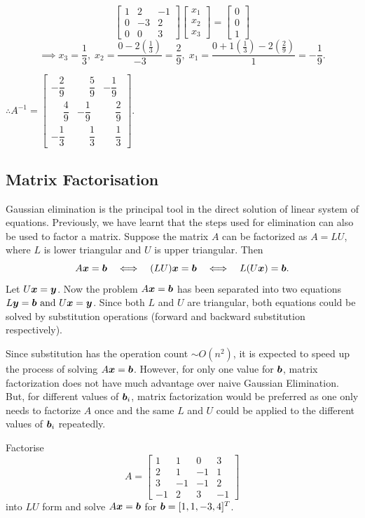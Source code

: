 \begin{solution}[5.0cm]
\medskip

\[
\begin{bmatrix}
1 & 2 & -1\\
0 & -3 & 2\\
0 & 0 & 3
\end{bmatrix}
\begin{bmatrix}
x_1 \\ x_2 \\ x_3
\end{bmatrix}
=
\begin{bmatrix}
0 \\ 0 \\ 1
\end{bmatrix}
\]
\[
\implies
x_3 = \frac13, \; x_2 = \frac{0-2(\frac13)}{-3} = \frac29, \; x_1 = \frac{0+1(\frac13)-2(\frac29)}{1}=-\frac19.
\]

\medskip
\(
 \therefore A^{-1}=\begin{bmatrix}
 -\dfrac29&\phantom{-}\dfrac59&-\dfrac19\\[3mm]
 \phantom{-}\dfrac49&-\dfrac19&\phantom{-}\dfrac29\\[3mm]
 -\dfrac13&\phantom{-}\dfrac13&\phantom{-}\dfrac13
 \end{bmatrix}.
\)
\end{solution}

\subsection{Matrix Factorisation}
Gaussian elimination is the principal tool in the direct solution of linear system of equations. Previously, we have learnt that the steps used for elimination can also be used to factor a matrix.
Suppose the matrix \(A\) can be factorized as $A=LU$,
where $L$ is lower triangular and $U$ is upper triangular.  Then
\[
 A\boldsymbol{x}=\boldsymbol{b}
 \quad\Longleftrightarrow\quad
 (LU)\boldsymbol{x}=\boldsymbol{b}
 \quad\Longleftrightarrow\quad
 L(U\boldsymbol{x})=\boldsymbol{b}.
\]
Let $U\boldsymbol{x}=\boldsymbol{y}$.  Now the problem $A\boldsymbol{x} = \boldsymbol{b}$ has been separated into two equations $L\boldsymbol{y} = \boldsymbol{b} \text{ and } U\boldsymbol{x} = \boldsymbol{y}$. Since both $L$ and $U$ are triangular, both equations could be solved by substitution operations (forward and backward substitution respectively).

Since substitution has the operation count $\sim O(n^2)$, it is expected to speed up the process of solving $A\boldsymbol{x} = \boldsymbol{b}$. However, for only one value for $\boldsymbol{b}$, matrix factorization does not have much advantage over naive Gaussian Elimination. But, for different values of $\boldsymbol{b}_i$, matrix factorization would be preferred as one only needs to factorize $A$ once and the same $L$ and $U$ could be applied to the different values of $\boldsymbol{b}_i$ repeatedly.
\begin{example}
Factorise
\[
 A=\begin{bmatrix}
 1&1&0&3\\
 2&1&-1&1\\
 3&-1&-1&2\\
 -1&2&3&-1
 \end{bmatrix}
\]
into $LU$ form and solve $A\boldsymbol{x}=\boldsymbol{b}$ for
$\boldsymbol{b}=[1,1,-3,4]^T$.
\end{example}

